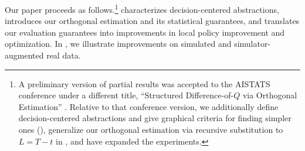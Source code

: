 \documentclass[opre,nonblindrev]{informs4}
\begin{document}
Our paper proceeds as follows.\footnote{A preliminary version of partial results was accepted to the AISTATS conference under a different title, ``Structured Difference-of-$Q$ via Orthogonal Estimation'' \citep{cao2024structured}. Relative to that conference version, we additionally define decision-centered abstractions and give graphical criteria for finding simpler ones (), generalize our orthogonal estimation via recursive substitution to $L=T-t$ in , and have expanded the experiments. }  characterizes decision-centered abstractions,  introduces our orthogonal estimation and its statistical guarantees, and  translates our evaluation guarantees into improvements in local policy improvement and optimization. In , we illustrate improvements on simulated and simulator-augmented real data. 


\end{document}
